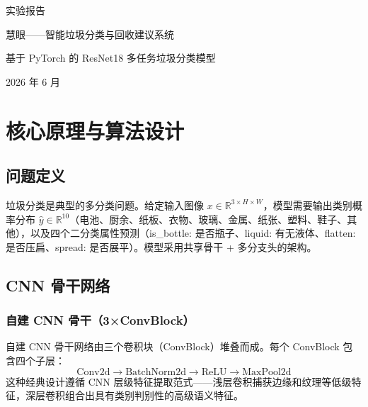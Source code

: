 \documentclass[11pt,a4paper]{ctexart}
\title{}
\author{}
\date{}
\newcommand{\rb}[1]{\ensuremath{\mathbb{R}^{#1}}}
\begin{document}
\begin{titlepage}
\centering
\vspace*{2cm}
{\heiti\fontsize{32pt}{40pt}\selectfont 实验报告\par}
\vspace{1cm}
{\heiti\fontsize{26pt}{34pt}\selectfont\color[HTML]{2E7D32} 慧眼——智能垃圾分类与回收建议系统\par}
\vspace{0.8cm}
{\songti\fontsize{14pt}{20pt}\selectfont\color[HTML]{666666} 基于 PyTorch 的 ResNet18 多任务垃圾分类模型\par}
\vspace{2cm}
{\songti\fontsize{14pt}{20pt}\selectfont\color[HTML]{888888} 2026 年 6 月\par}
\end{titlepage}


\section{核心原理与算法设计}

\subsection{问题定义}

垃圾分类是典型的多分类问题。给定输入图像 $x \in \rb{3 \times H \times W}$，模型需要输出类别概率分布 $\hat{y} \in \rb{10}$（电池、厨余、纸板、衣物、玻璃、金属、纸张、塑料、鞋子、其他），以及四个二分类属性预测（is\_bottle: 是否瓶子、liquid: 有无液体、flatten: 是否压扁、spread: 是否展平）。模型采用共享骨干 + 多分支头的架构。

\subsection{CNN 骨干网络}

\subsubsection{自建 CNN 骨干（3×ConvBlock）}

自建 CNN 骨干网络由三个卷积块（ConvBlock）堆叠而成。每个 ConvBlock 包含四个子层：
\[
\text{Conv2d} \rightarrow \text{BatchNorm2d} \rightarrow \text{ReLU} \rightarrow \text{MaxPool2d}
\]
这种经典设计遵循 CNN 层级特征提取范式——浅层卷积捕获边缘和纹理等低级特征，深层卷积组合出具有类别判别性的高级语义特征。
\end{document}
